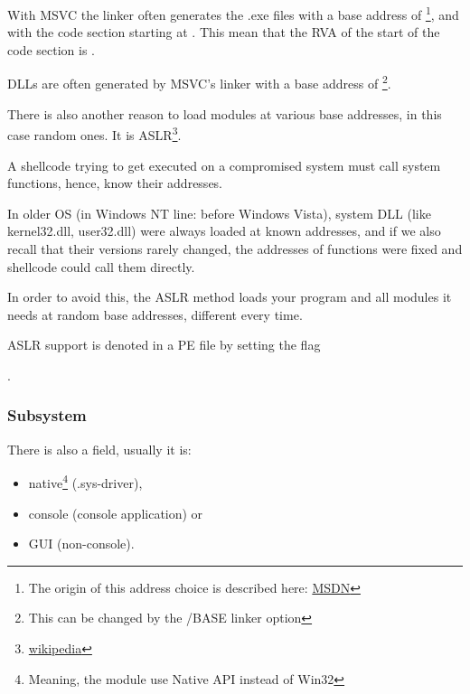 \par With \ac{MSVC} the linker often generates the .exe files with a base address of 
\footnote{The origin of this address choice is described here: \href{http://go.yurichev.com/17041}{MSDN}},
and with the code section starting at .
This mean that the \ac{RVA} of the start of the code section is .

DLLs are often generated by MSVC's linker with a base address of 
\footnote{This can be changed by the /BASE linker option}.


There is also another reason to load modules at various base addresses, in this case random ones.
It is \ac{ASLR}\footnote{\href{http://go.yurichev.com/17140}{wikipedia}}.


A shellcode trying to get executed on a compromised system must call system functions, hence, know their addresses.

In older \ac{OS} (in \gls{Windows NT} line: before Windows Vista),
system DLL (like kernel32.dll, user32.dll) were always loaded at known addresses, 
and if we also recall
that their versions rarely changed, the addresses of functions were
fixed and shellcode could call them directly.

In order to avoid this, the \ac{ASLR}
method loads your program and all modules it needs at random base addresses, different every time.

\ac{ASLR} support is denoted in a PE file by setting the flag
\par {} .

\subsubsection{Subsystem}

There is also a  field, usually it is:


\begin{itemize}
\item native\footnote{Meaning, the module use Native API instead of Win32} (.sys-driver), 

\item console (console application) or

\item \ac{GUI} (non-console).
\end{itemize}

